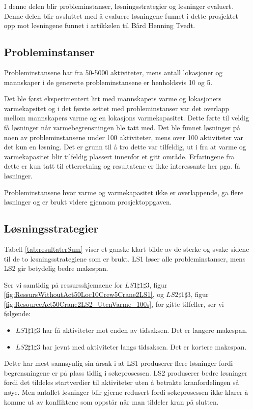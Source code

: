 I denne delen blir probleminstanser, løsningsstrategier og løsninger evaluert. Denne delen blir avsluttet med å evaluere løsningene funnet i dette prosjektet opp mot løsningene funnet i artikkelen til Bård Henning Tvedt.

\subsection{Probleminstanser}
Probleminstansene har fra 50-5000 aktiviteter, mens antall lokasjoner og mannskaper i de genererte probleminstansene er henholdsvis 10 og 5.

Det ble først eksperimentert litt med mannskapets varme og lokasjoners varmekapsitet og i det første settet med probleminstanser var det overlapp mellom mannskapers varme og en lokasjons varmekapasitet. Dette førte til veldig få løsninger når varmebegrensningen ble tatt med. Det ble funnet løsninger på noen av probleminstansene under 100 aktiviteter, mens over 100 aktiviteter var det kun en løsning. Det er grunn til å tro dette var tilfeldig, ut i fra at varme og varmekapasitet blir tilfeldig plassert innenfor et gitt område. Erfaringene fra dette er kun tatt til etterretning og resultatene er ikke interessante her pga. få løsninger.

Probleminstansene hvor varme og varmekapasitet ikke er overlappende, ga flere løsninger og er brukt videre gjennom prosjektoppgaven.

\subsection{Løsningsstrategier}
Tabell \ref{tab:resultaterSum} viser et ganske klart bilde av de sterke og svake sidene til de to løsningsstrategiene som er brukt. LS1 løser alle probleminstanser, mens LS2 gir betydelig bedre makespan.

Ser vi samtidig på ressursskjemaene for $LS1\sharp1\sharp3$, figur \ref{fig:RessursWithoutAct50Loc10Crew5Crane2LS1}, og $LS2\sharp1\sharp3$, figur \ref{fig:ResourceAct50Crane2LS2_UtenVarme_100s}, for gitte tilfeller, ser vi følgende:
\begin{itemize}
\item $LS1\sharp1\sharp3$ har få aktiviteter mot enden av tidsaksen. Det er langere makespan.
\item $LS2\sharp1\sharp3$ har jevnt med aktiviteter langs tidsaksen. Det er kortere makespan.
\end{itemize}
Dette har mest sannsynlig sin årsak i at LS1 produserer flere løsninger fordi begrensningene er på plass tidlig i søkeprosessen.
LS2 produserer bedre løsninger fordi det tildeles startverdier til aktiviteter uten å betrakte kranfordelingen så nøye. Men antallet løsninger blir gjerne redusert fordi søkeprosessen ikke klarer å komme ut av konfliktene som oppstår når man tildeler kran på slutten.

